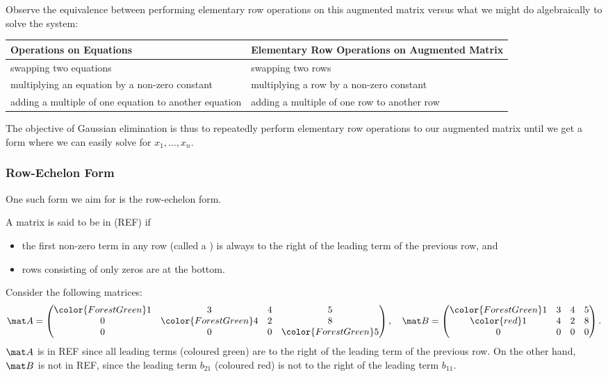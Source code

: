 Observe the equivalence between performing elementary row operations on this augmented matrix versus what we might do algebraically to solve the system: 

\begin{table}[H]
    \centering
    \begin{tabularx}{\columnwidth}{|>{\centering\arraybackslash}X|>{\centering\arraybackslash}X|}
    \hline
    \textbf{Operations on Equations} & \textbf{Elementary Row Operations on Augmented Matrix} \\ \hline
    swapping two equations & swapping two rows \\ \hline
    multiplying an equation by a non-zero constant & multiplying a row by a non-zero constant \\ \hline
    adding a multiple of one equation to another equation & adding a multiple of one row to another row \\ \hline
    \end{tabularx}
\end{table}

The objective of Gaussian elimination is thus to repeatedly perform elementary row operations to our augmented matrix until we get a form where we can easily solve for $x_1, \dots, x_n$.

\subsubsection{Row-Echelon Form}

One such form we aim for is the row-echelon form.

\begin{definition}
    A matrix is said to be in  (REF) if
    \begin{itemize}
        \item the first non-zero term in any row (called a ) is always to the right of the leading term of the previous row, and
        \item rows consisting of only zeros are at the bottom.
    \end{itemize}
\end{definition}

\begin{example}
    Consider the following matrices: \[\mat A = \begin{pmatrix} {\color{ForestGreen}1} & 3 & 4 & 5 \\ 0 & {\color{ForestGreen}4} & 2 & 8 \\ 0 & 0 & 0 & {\color{ForestGreen} 5} \end{pmatrix}, \quad \mat B = \begin{pmatrix}{\color{ForestGreen} 1} & 3 & 4 & 5 \\ {\color{red} 1} & 4 & 2 & 8 \\ 0 & 0 & 0 & 0 \end{pmatrix}.\] $\mat A$ is in REF since all leading terms (coloured green) are to the right of the leading term of the previous row. On the other hand, $\mat B$ is not in REF, since the leading term $b_{21}$ (coloured red) is not to the right of the leading term $b_{11}$.
\end{example}

